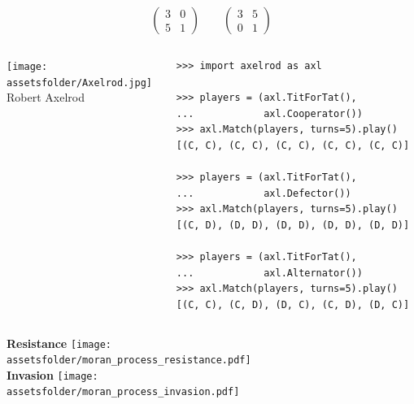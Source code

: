 \documentclass{beamer}
\newcommand{\assetsfolder}{./assets}
\begin{document}
    \begin{frame}
        \Huge
        \[
            \begin{pmatrix}
                3 & 0\\
                5 & 1
            \end{pmatrix}
            \qquad
            \begin{pmatrix}
                3 & 5\\
                0 & 1
            \end{pmatrix}
        \]
    \end{frame}

    \begin{frame}[fragile]{}
        \begin{columns}
            \begin{column}{.4\textwidth}
                \begin{center}
                    \texttt{[image: \\assetsfolder/Axelrod.jpg]}
                    \\
                    Robert Axelrod
                \end{center}
            \end{column}
            \pause
            \begin{column}{.6\textwidth}
                \begin{verbatim}
>>> import axelrod as axl

>>> players = (axl.TitForTat(),
...            axl.Cooperator())
>>> axl.Match(players, turns=5).play()
[(C, C), (C, C), (C, C), (C, C), (C, C)]

>>> players = (axl.TitForTat(),
...            axl.Defector())
>>> axl.Match(players, turns=5).play()
[(C, D), (D, D), (D, D), (D, D), (D, D)]

>>> players = (axl.TitForTat(),
...            axl.Alternator())
>>> axl.Match(players, turns=5).play()
[(C, C), (C, D), (D, C), (C, D), (D, C)]

                \end{verbatim}
            \end{column}
        \end{columns}
\end{frame}

\begin{frame}

    \begin{center}
        \textbf{Resistance}
        \texttt{[image: \\assetsfolder/moran\_process\_resistance.pdf]}\\

        \textbf{Invasion}
        \texttt{[image: \\assetsfolder/moran\_process\_invasion.pdf]}
    \end{center}
\end{frame}
\end{document}
